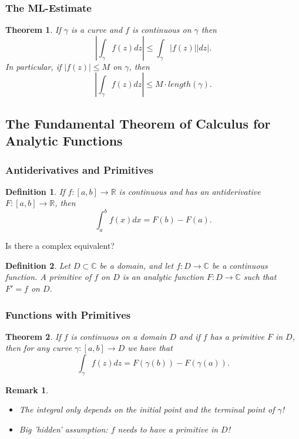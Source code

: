 \documentclass{article}
\newtheorem{theorem}{Theorem}[section]
\newtheorem*{remark}{Remark}
\newtheorem{definition}{Definition}[section]
\begin{document}
\subsubsection{The ML-Estimate}
\begin{theorem}
If $\gamma$ is a curve and $f$ is continuous on $\gamma$ then
\begin{equation*}
\left|\int_{\gamma}f(z)dz\right| \leq \int_{\gamma}\left|f(z)\right|\left|dz\right|.
\end{equation*}
In particular, if $\left|f(z)\right| \leq M$ on $\gamma$, then
\begin{equation*}
\left|\int_{\gamma}f(z)dz\right| \leq M \cdot length(\gamma).
\end{equation*}
\end{theorem}

\subsection{The Fundamental Theorem of Calculus for Analytic Functions}
\subsubsection{Antiderivatives and Primitives}
\begin{definition}
If $f : [a, b] \to \mathbb{R}$ is continuous and has an antiderivative $F : [a, b] \to \mathbb{R}$, then
\begin{equation*}
\int_a^b f(x)dx = F(b) - F(a).
\end{equation*}
\end{definition}
Is there a complex equivalent?
\begin{definition}
Let $D \subset \mathbb{C}$ be a domain, and let $f : D \to \mathbb{C}$ be a continuous function. A primitive of $f$ on $D$ is an analytic function $F : D \to \mathbb{C}$ such that $F' = f$ on $D$.
\end{definition}

\subsubsection{Functions with Primitives}
\begin{theorem}
If $f$ is continuous on a domain $D$ and if $f$ has a primitive $F$ in $D$, then for any curve $\gamma : [a, b] \to D$ we have that
\begin{equation*}
\int_{\gamma}f(z)dz = F(\gamma(b)) - F(\gamma(a)).
\end{equation*}
\end{theorem}
\begin{remark}
\begin{itemize}
\item The integral only depends on the initial point and the terminal point of $\gamma$!
\item Big 'hidden' assumption: $f$ needs to have a primitive in $D$!
\end{itemize}
\end{remark}
\end{document}
